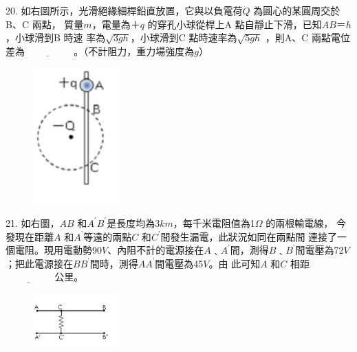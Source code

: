 \documentclass[cn,10pt,math=newtx,chinesefont=founder,device=ig]{elegantbook}
\begin{document}
\begin{example}
   20. 如右圖所示，光滑絕緣細桿鉛直放置，它與以負電荷$Q$ 為圓心的某圓周交於B、C 兩點，
質量$m$，電量為$＋q$ 的穿孔小球從桿上A 點自靜止下滑，已知$AB＝h$，小球滑到B 時速
率為$\sqrt{3gh}$，小球滑到C 點時速率為$\sqrt{5gh}$ ，則A、C 兩點電位差為$\underline{\hspace{2cm}}$ 。（不計阻力，重力場強度為$g$）\\
    \rightline{[中壢高中教甄109]}
\end{example}
\begin{solution}
    
\end{solution}
\begin{figure}[htbp]
    \flushright
    \includegraphics[width=0.3\textwidth]{image/109中壢20.png}
  \end{figure}
\newpage

\begin{example}
   21. 如右圖，$AB$ 和$A^{'}  B^{'}$是長度均為3$km$，每千米電阻值為1$\Omega$ 的兩根輸電線，
今發現在距離$A$ 和$A^{’}$等遠的兩點$C$ 和$C^{’}$間發生漏電，此狀況如同在兩點間
連接了一個電阻。現用電動勢90$V$、內阻不計的電源接在$A﹑A^{’}$間，測得$B﹑
B^{’}$間電壓為72$V$；把此電源接在$B  B^{’}$間時，測得$A  A^{’}$間電壓為45$V$。由
此可知$A$ 和$C$ 相距$\underline{\hspace{2cm}}$ 公里。\\
    \rightline{[中壢高中教甄109]}
\end{example}
\begin{solution}
    
\end{solution}
\begin{figure}[htbp]
    \flushright
    \includegraphics[width=0.3\textwidth]{image/109中壢21.png}
  \end{figure}
\newpage
\end{document}

